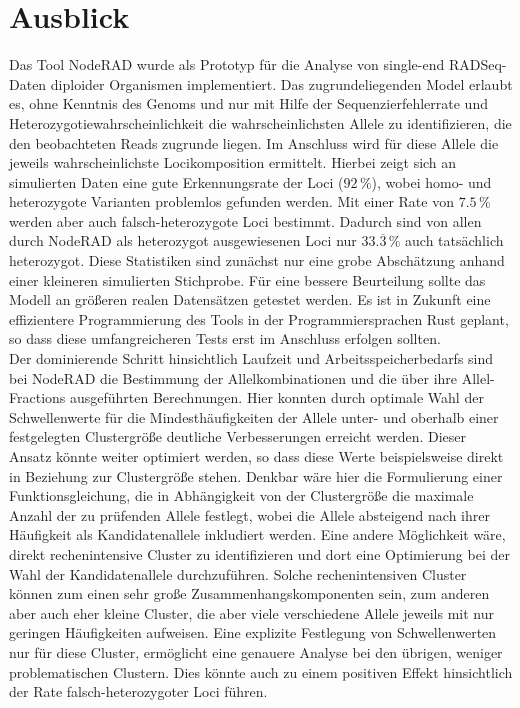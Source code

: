\chapter{Ausblick} \label{sec:ausblick}

Das Tool NodeRAD \cite{noderad} wurde als Prototyp für die Analyse von single-end RADSeq-Daten diploider Organismen implementiert. Das zugrundeliegenden Model erlaubt es, ohne Kenntnis des Genoms und nur mit Hilfe der Sequenzierfehlerrate und Heterozygotiewahrscheinlichkeit die wahrscheinlichsten Allele zu identifizieren, die den beobachteten Reads zugrunde liegen. Im Anschluss wird für diese Allele die jeweils wahrscheinlichste Locikomposition ermittelt. Hierbei zeigt sich an simulierten Daten eine gute Erkennungsrate der Loci ($ 92\, \% $), wobei homo- und heterozygote Varianten problemlos gefunden werden. Mit einer Rate von $ 7.5\, \% $ werden aber auch falsch-heterozygote Loci bestimmt. Dadurch sind von allen durch NodeRAD als heterozygot ausgewiesenen Loci nur $ 33.\overline{3}\, \% $ auch tatsächlich heterozygot. Diese Statistiken sind zunächst nur eine grobe Abschätzung anhand einer kleineren simulierten Stichprobe. Für eine bessere Beurteilung sollte das Modell an größeren realen Datensätzen getestet werden. Es ist in Zukunft eine effizientere Programmierung des Tools in der Programmiersprachen Rust geplant, so dass diese umfangreicheren Tests erst im Anschluss erfolgen sollten. \\

Der dominierende Schritt hinsichtlich Laufzeit und Arbeitsspeicherbedarfs sind bei NodeRAD die Bestimmung der Allelkombinationen und die über ihre Allel-Fractions ausgeführten Berechnungen. Hier konnten durch optimale Wahl der Schwellenwerte für die Mindesthäufigkeiten der Allele unter- und oberhalb einer festgelegten Clustergröße deutliche Verbesserungen erreicht werden. Dieser Ansatz könnte weiter optimiert werden, so dass diese Werte beispielsweise direkt in Beziehung zur Clustergröße stehen. Denkbar wäre hier die Formulierung einer Funktionsgleichung, die in Abhängigkeit von der Clustergröße die maximale Anzahl der zu prüfenden Allele festlegt, wobei die Allele absteigend nach ihrer Häufigkeit als Kandidatenallele inkludiert werden. Eine andere Möglichkeit wäre, direkt rechenintensive Cluster zu identifizieren und dort eine Optimierung bei der Wahl der Kandidatenallele durchzuführen. Solche rechenintensiven Cluster können zum einen sehr große Zusammenhangskomponenten sein, zum anderen aber auch eher kleine Cluster, die aber viele verschiedene Allele jeweils mit nur geringen Häufigkeiten aufweisen. Eine explizite Festlegung von Schwellenwerten nur für diese Cluster, ermöglicht eine genauere Analyse bei den übrigen, weniger problematischen Clustern. Dies könnte auch zu einem positiven Effekt hinsichtlich der Rate falsch-heterozygoter Loci führen. \\

